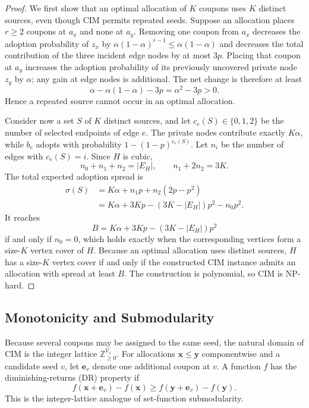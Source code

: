 \documentclass[sigconf,balance=false]{acmart}
\begin{document}
\begin{proof}
We first show that an optimal allocation of $K$ coupons uses $K$
distinct sources, even though CIM permits repeated seeds.
Suppose an allocation places $r\geq2$ coupons at $a_x$ and none at $a_y$.
Removing one coupon from $a_x$ decreases the adoption probability of
$z_x$ by
$\alpha(1-\alpha)^{r-1}\leq\alpha(1-\alpha)$ and decreases the total
contribution of the three incident edge nodes by at most $3p$.
Placing that coupon at $a_y$ increases the adoption probability of its
previously uncovered private node $z_y$ by $\alpha$; any gain at edge
nodes is additional.
The net change is therefore at least
\[
  \alpha-\alpha(1-\alpha)-3p=\alpha^2-3p>0.
\]
Hence a repeated source cannot occur in an optimal allocation.

Consider now a set $S$ of $K$ distinct sources, and let
$c_e(S)\in\{0,1,2\}$ be the number of selected endpoints of edge $e$.
The private nodes contribute exactly $K\alpha$, while $b_e$ adopts with
probability $1-(1-p)^{c_e(S)}$.
Let $n_i$ be the number of edges with $c_e(S)=i$.
Since $H$ is cubic,
\[
  n_0+n_1+n_2=|E_H|,
  \qquad n_1+2n_2=3K.
\]
The total expected adoption spread is
\begin{align*}
  \sigma(S)
  &=K\alpha+n_1p+n_2(2p-p^2)\\
  &=K\alpha+3Kp-(3K-|E_H|)p^2-n_0p^2.
\end{align*}
It reaches
\[
  B=K\alpha+3Kp-(3K-|E_H|)p^2
\]
if and only if $n_0=0$, which holds exactly when the corresponding
vertices form a size-$K$ vertex cover of $H$.
Because an optimal allocation uses distinct sources, $H$ has a size-$K$
vertex cover if and only if the constructed CIM instance admits an allocation
with spread at least $B$. The construction is polynomial, so CIM is NP-hard.
\end{proof}

\subsection{Monotonicity and Submodularity}

Because several coupons may be assigned to the same seed, the natural
domain of CIM is the integer lattice $\mathbb{Z}_{\geq0}^{V_s}$.
For allocations $\bm{x}\leq\bm{y}$ componentwise and a candidate seed
$v$, let $\bm{e}_v$ denote one additional coupon at $v$.
A function $f$ has the diminishing-returns (DR) property if
\[
  f(\bm{x}+\bm{e}_v)-f(\bm{x})
  \geq
  f(\bm{y}+\bm{e}_v)-f(\bm{y}).
\]
This is the integer-lattice analogue of set-function submodularity.
\end{document}
